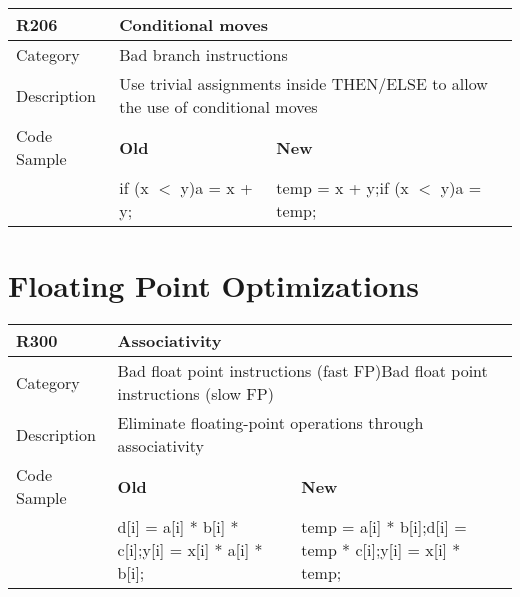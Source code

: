 \begin{tabular}{|p{0.9in}|p{2.0in}|p{2.0in}|} \hline
\textbf{R206}       & \multicolumn{2}{|p{4.0in}|}{\textbf{Conditional moves}} \\ \hline
Category            & \multicolumn{2}{|p{4.0in}|}{Bad branch instructions} \\ \hline
Description         & \multicolumn{2}{|p{4.0in}|}{Use trivial assignments inside THEN/ELSE to allow the use of conditional moves } \\ \hline
Code Sample         & \textbf{Old} & \textbf{New} \\ \hline
                    & if (x $<$ y)\newline   a = x + y;
                    & temp = x + y;\newline if (x $<$ y)\newline   a = temp;  \\ \hline
\end{tabular}

\section{Floating Point Optimizations}
\label{sec:Floating_Point_Optimizations}

\begin{tabular}{|p{0.9in}|p{2.0in}|p{2.0in}|} \hline
\textbf{R300}       & \multicolumn{2}{|p{4.0in}|}{\textbf{Associativity}} \\ \hline
Category            & \multicolumn{2}{|p{4.0in}|}{Bad float point instructions (fast FP)\newline Bad float point instructions (slow FP)} \\ \hline
Description         & \multicolumn{2}{|p{4.0in}|}{Eliminate floating-point operations through associativity} \\ \hline
Code Sample         & \textbf{Old} & \textbf{New} \\ \hline
                    & d[i] = a[i] * b[i] * c[i];\newline y[i] = x[i] * a[i] * b[i];
                    & temp = a[i] * b[i];\newline d[i] = temp * c[i];\newline y[i] = x[i] * temp;  \\ \hline
\end{tabular}

